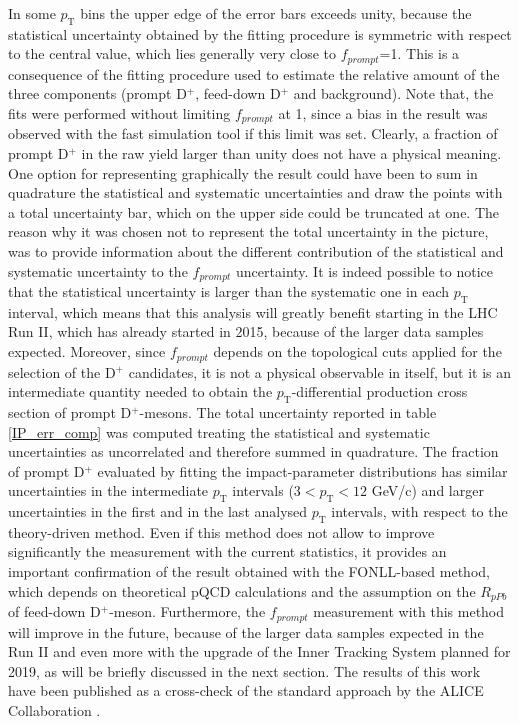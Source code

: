 \documentclass[b5paper,10pt,twoside,oldstyle,classica]{toptesi}
\newcommand{\pt}{p_\text{T}}
\begin{document}
\begin{figure}[tb]
\end{figure} In some $\pt$ bins the upper edge of the error bars exceeds unity, because the statistical uncertainty obtained by the fitting procedure is symmetric with respect to the central value, which lies generally very close to $f_{prompt}$=1. This is a consequence of the fitting procedure used to estimate the relative amount of the three components (prompt D$^+$, feed-down D$^+$ and background). Note that, the fits were performed without limiting $f_{prompt}$ at 1, since a bias in the result was observed with the fast simulation tool if this limit was set. Clearly, a fraction of prompt D$^+$ in the raw yield larger than unity does not have a physical meaning. One option for representing graphically the result could have been to sum in quadrature the statistical and systematic uncertainties and draw the points with a total uncertainty bar, which on the upper side could be truncated at one. The reason why it was chosen not to represent the total uncertainty in the picture, was to provide information about the different contribution of the statistical and systematic uncertainty to the $f_{prompt}$ uncertainty. It is indeed possible to notice that the statistical uncertainty is larger than the systematic one in each $\pt$ interval, which means that this analysis will greatly benefit starting in the LHC Run II, which has already started in 2015, because of the larger data samples expected. Moreover, since $f_{prompt}$ depends on the topological cuts applied for the selection of the D$^+$ candidates, it is not a physical observable in itself, but it is an intermediate quantity needed to obtain the $\pt$-differential production cross section of prompt D$^+$-mesons. The total uncertainty reported in table \ref{IP_err_comp} was computed treating the statistical and systematic uncertainties as uncorrelated and therefore summed in quadrature. The fraction of prompt D$^+$ evaluated by fitting the impact-parameter distributions has similar uncertainties in the intermediate $\pt$ intervals ($3<\pt<12$ GeV/c) and larger uncertainties in the first and in the last analysed $\pt$ intervals, with respect to the theory-driven method. Even if this method does not allow to improve significantly the measurement with the current statistics, it provides an important confirmation of the result obtained with the FONLL-based method, which depends on theoretical pQCD calculations and the assumption on the $R_{pPb}$ of feed-down D$^+$-meson. Furthermore, the $f_{prompt}$ measurement with this method will improve in the future, because of the larger data samples expected in the Run II and even more with the upgrade of the Inner Tracking System planned for 2019, as will be briefly discussed in the next section. The results of this work have been published as a cross-check of the standard approach by the ALICE Collaboration \cite{Adam:2016ich}. 
\end{document}
